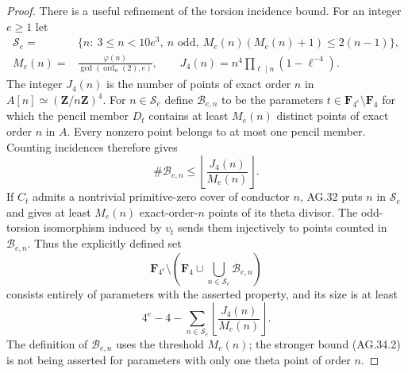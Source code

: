 \begin{proof}
There is a useful refinement of the torsion incidence bound.
For an integer $e\ge1$ let
\[
\begin{split}
 \mathcal S_e={}&\{n:\ 3\le n<10e^3,\ n\text{ odd},\
       M_e(n)(M_e(n)+1)\le2(n-1)\},\\
 M_e(n)={}&\frac{\varphi(n)}{\gcd(\operatorname{ord}_n(2),e)},\qquad
 J_4(n)=n^4\prod_{\ell\mid n}(1-\ell^{-4}).
\end{split}                                                   \tag{AG.34.1}
\]
The integer $J_4(n)$ is the number of points of exact order
$n$ in $A[n]\simeq(\mathbf Z/n\mathbf Z)^4$.
For $n\in\mathcal S_e$ define $\mathcal B_{e,n}$ to be
the parameters $t\in\mathbf F_{4^e}\setminus\mathbf F_4$
for which the pencil member $D_t$ contains at least
$M_e(n)$ distinct points of exact order $n$ in $A$.
Every nonzero point belongs to at most one pencil member.
Counting incidences therefore gives
\[
               \#\mathcal B_{e,n}
                  \le\left\lfloor\frac{J_4(n)}{M_e(n)}\right\rfloor.
                                                               \tag{AG.34.2}
\]
If $C_t$ admits a nontrivial primitive-zero cover of
conductor $n$, AG.32 puts $n$ in $\mathcal S_e$ and gives
at least $M_e(n)$ exact-order-$n$ points of its theta
divisor. The odd-torsion isomorphism induced by $v_t$
sends them injectively to points counted in
$\mathcal B_{e,n}$. Thus the explicitly defined set
\[
 \mathbf F_{4^e}\setminus
       \left(\mathbf F_4\cup
          \bigcup_{n\in\mathcal S_e}\mathcal B_{e,n}\right)
                                                               \tag{AG.34.3}
\]
consists entirely of parameters with the asserted property,
and its size is at least
\[
       4^e-4-
       \sum_{n\in\mathcal S_e}
          \left\lfloor\frac{J_4(n)}{M_e(n)}\right\rfloor.
                                                               \tag{AG.34.4}
\]
The definition of $\mathcal B_{e,n}$ uses the threshold
$M_e(n)$; the stronger bound (AG.34.2) is not being asserted
for parameters with only one theta point of order $n$.


\end{proof}
